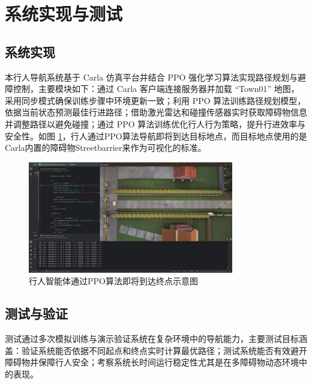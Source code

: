 \section{系统实现与测试}

\subsection{系统实现}

本行人导航系统基于 Carla 仿真平台并结合 PPO 强化学习算法实现路径规划与避障控制，主要模块如下：通过 Carla 客户端连接服务器并加载 “Town01” 地图，采用同步模式确保训练步骤中环境更新一致；利用 PPO 算法训练路径规划模型，依据当前状态预测最佳行进路径；借助激光雷达和碰撞传感器实时获取障碍物信息并调整路径以避免碰撞；通过 PPO 算法训练优化行人行为策略，提升行进效率与安全性。如图 \ref{fig:ped_nav}，行人通过PPO算法导航即将到达目标地点，而目标地点使用的是Carla内置的障碍物Streetbarrier来作为可视化的标准。

\begin{figure}[H]
    \centering
    \includegraphics[width=0.8\textwidth]{images/pedestrain_navgation.pdf}
    \caption{行人智能体通过PPO算法即将到达终点示意图}
    \label{fig:ped_nav}
\end{figure}

\subsection{测试与验证}

测试通过多次模拟训练与演示验证系统在复杂环境中的导航能力，主要测试目标涵盖：验证系统能否依据不同起点和终点实时计算最优路径；测试系统能否有效避开障碍物并保障行人安全；考察系统长时间运行稳定性尤其是在多障碍物动态环境中的表现。
